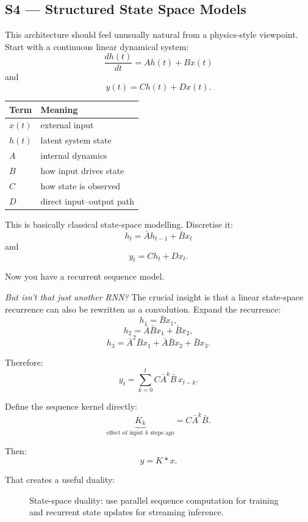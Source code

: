 \subsection{S4 --- Structured State Space Models}
\label{subsec:modern-s4}
This architecture should feel unusually natural from a physics-style viewpoint.
Start with a continuous linear dynamical system:
\[
\frac{d h(t)}{dt}
=
A h(t)+B x(t)
\]
and
\[
y(t)=C h(t)+D x(t).
\]

\begin{center}
\small
\begin{tabularx}{.88\linewidth}{@{}L{.16\linewidth}Y@{}}
\toprule
\textbf{Term} & \textbf{Meaning} \\
\midrule
$x(t)$ & external input \\
$h(t)$ & latent system state \\
$A$ & internal dynamics \\
$B$ & how input drives state \\
$C$ & how state is observed \\
$D$ & direct input--output path \\
\bottomrule
\end{tabularx}
\end{center}

This is basically classical state-space modelling.
Discretise it:
\[
h_t
=
\bar A h_{t-1}+\bar B x_t
\]
and
\[
y_t
=
C h_t+D x_t.
\]

Now you have a recurrent sequence model.

\textit{But isn't that just another RNN?}
The crucial insight is that a linear state-space recurrence can also be rewritten as a convolution.
Expand the recurrence:
\[
h_1=\bar Bx_1,
\]
\[
h_2=\bar A\bar Bx_1+\bar Bx_2,
\]
\[
h_3=\bar A^2\bar Bx_1+\bar A\bar Bx_2+\bar Bx_3.
\]

Therefore:
\[
y_t
=
\sum_{k=0}^{t}
C\bar A^k\bar B\,x_{t-k}.
\]

Define the sequence kernel directly:
\[
\underbrace{K_k}_{\text{effect of input }k\text{ steps ago}}
=
C\bar A^k\bar B.
\]

Then:
\[
y=K*x.
\]

That creates a useful duality:

\begin{figure}[htbp]
\centering
{}
\caption{State-space duality: use parallel sequence computation for training and recurrent state updates for streaming inference.}
\label{fig:modern-s4-duality}
\end{figure}

